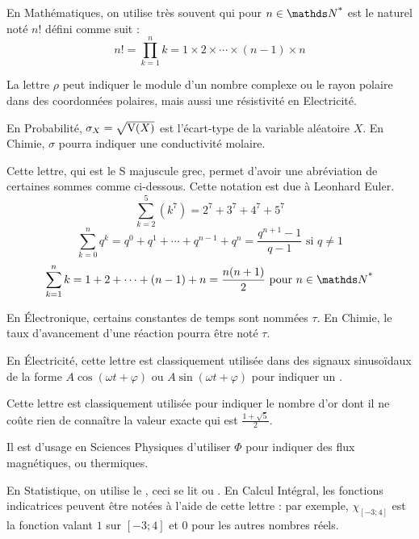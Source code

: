 \noindent En Mathématiques, on utilise très souvent  qui pour $ n \in \NN^{\text{*}}$ est le naturel noté $n!$ \label{factoriel} défini comme suit :
\begin{equation}
    n! = \prod_{k = 1}^{n} k = 1 \times 2 \times \cdots \times(n-1) \times n
\end{equation}


\cadre{$\rho$} La lettre $\rho$ peut indiquer le module d’un nombre complexe ou le rayon polaire dans des coordonnées polaires, mais aussi une résistivité en Electricité.


\cadre{$\sigma$} En Probabilité, $\sigma_X = \sqrt{\mathrm{V}(X)}$ est l'écart-type de la variable aléatoire $X$. En Chimie, $\sigma$ pourra indiquer une conductivité molaire.


\cadre{$\Sigma$} Cette lettre, qui est le S majuscule grec, permet d'avoir une abréviation de certaines sommes comme ci-dessous. Cette notation est due à Leonhard Euler.
\begin{equation}
    \sum_{k = 2}^{5} \left( k^7 \right) = 2^7 + 3^7 + 4^7 + 5^7
\end{equation}
\begin{equation}
    \sum_{k = 0}^{n} q^k = q^0 + q^1  + \cdots + q^{n-1} + q^n = \frac{q^{n+1} - 1}{q - 1} \text{ si } q \neq 1
\end{equation}
\begin{equation}
    \sum_{k = 1}^{n} k = 1 + 2 + \cdots + (n-1) + n = \frac{n (n + 1)}{2}  \text{ pour } n \in \NNs
\end{equation}


\cadre{$\tau$} En Électronique, certains constantes de temps sont nommées $\tau$. En Chimie, le taux d'avancement d'une réaction pourra être noté $\tau$.


\cadre{$\varphi$} En Électricité, cette lettre est classiquement utilisée dans des signaux sinusoïdaux de la forme $A\cos(\omega t + \varphi)$ ou $A\sin(\omega t + \varphi)$ pour indiquer un .

\cadre{$\phi$} Cette lettre est classiquement utilisée pour indiquer le nombre d'or dont il ne coûte rien de connaître la valeur exacte qui est $\frac{1 + \sqrt{5}}{2}$.


\cadre{$\Phi$} Il est d'usage en Sciences Physiques d'utiliser $\Phi$ pour indiquer des flux magnétiques, ou thermiques.


\cadre{$\chi$} En Statistique, on utilise le , ceci se lit  ou . En Calcul Intégral, les fonctions indicatrices peuvent être notées à l'aide de cette lettre : par exemple, $\chi_{[-3;4]}$ est la fonction valant $1$ sur $[-3;4]$ et $0$ pour les autres nombres réels.


